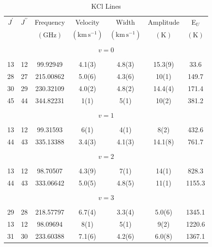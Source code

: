 \documentclass[twocolumn]{aastex62}
\begin{document}
\begin{table}[h!]
\centering
\caption{KCl Lines}
\begin{tabular}{ccccccc}
\label{tab:KCl_salt_lines}
$J^{\prime}$ & $J^{\prime\prime}$ & Frequency & Velocity & Width & Amplitude& E$_U$ \\
 && $\mathrm{(GHz)}$ & $\mathrm{(km\,s^{-1})}$  & $\mathrm{(km\,s^{-1})}$ & $\mathrm{(K)}$  & $\mathrm{(K)}$ \\
\hline
&\vspace{-0.75em}\\
\multicolumn{7}{c}{$v = 0$} \\
\vspace{-0.75em}\\

13 & 12 & 99.92949 & 4.1(3) 	& 4.8(3)	& 15.3(9)	& 33.6 \\
28 & 27 & 215.00862 & 5.0(6) 	& 4.3(6)	& 10(1) 	& 149.7 \\
30 & 29 & 230.32109 & 4.0(2) 	& 4.8(2)	& 14.4(4) 	& 171.4 \\
45 & 44 & 344.82231 & 1(1) 		& 5(1)		& 10(2) 	& 381.2 \\

&\vspace{-0.75em}\\
\multicolumn{7}{c}{$v = 1$} \\
\vspace{-0.75em}\\

13 & 12 & 99.31593 & 6(1) 		& 4(1)		& 8(2) 		& 432.6 \\
44 & 43 & 335.13388 & 3.4(3) 	& 4.1(3)	& 14.1(8)	& 761.7 \\

&\vspace{-0.75em}\\
\multicolumn{7}{c}{$v = 2$} \\
\vspace{-0.75em}\\

13 & 12 & 98.70507 & 4.3(9)		& 7(1)		& 14(1)		 & 828.3 \\
44 & 43 & 333.06642 & 5.0(5)	& 4.8(5)	& 11(1) 	& 1155.3 \\

&\vspace{-0.75em}\\
\multicolumn{7}{c}{$v = 3$} \\
\vspace{-0.75em}\\
29 & 28 & 218.57797 & 6.7(4)	& 3.3(4)	& 5.0(6) & 1345.1 \\
13 & 12 & 98.09694 & 8(1)		& 5(1)		& 9(2)	&	1220.6 \\
31 & 30 & 233.60388 & 7.1(6)	& 4.2(6) 	& 6.0(8)& 1367.1 \\


\end{tabular}
\end{table}
\end{document}
